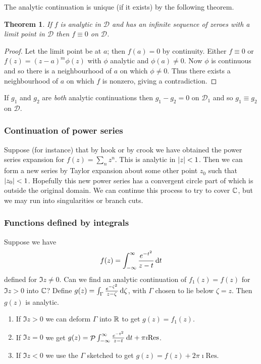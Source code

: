 \documentclass{notes}
\DeclareMathOperator{\Pv}{\mathcal{P}}
\newcommand{\Res}{\mathrm{Res}}
\newcommand{\D}{\mathcal{D}}
\theoremstyle{plain}
\newtheorem*{theorem}{Theorem}
\begin{document}
The analytic continuation is unique (if it exists) by the following theorem.

\begin{theorem}
If $f$ is analytic in $\D$ and has an infinite sequence of zeroes with a
limit point in $\D$ then $f \equiv 0$ on $\D$.
\end{theorem}

\begin{proof}
Let the limit point be at $a$; then $f(a)=0$ by continuity.  Either
$f \equiv 0$ or $f(z) = (z-a)^m \phi(z)$ with $\phi$ analytic and
$\phi(a) \neq 0$.  Now $\phi$ is continuous and so there is a neighbourhood
of $a$ on which $\phi \neq 0$.  Thus there exists a neighbourhood of
$a$ on which $f$ is nonzero, giving a contradiction.
\end{proof}

If $g_1$ and $g_2$ are \emph{both} analytic continuations then
$g_1 - g_2 = 0$ on $\D_1$ and so $g_1 \equiv g_2$ on $\D$.

\subsubsection*{Continuation of power series}

Suppose (for instance) that by hook or by crook we have obtained the
power series expansion for $f(z) = \sum_n z^n$.  This is analytic in
$\left|z\right| < 1$.  Then we can form a new series by Taylor expansion about some
other point $z_0$ such that $\left|z_0\right| < 1$.  Hopefully this new power series
has a convergent circle part of which is outside the original domain.  We
can continue this process to try to cover $\mathbb{C}$, but we may run into
singularities or branch cuts.

\subsubsection*{Functions defined by integrals}

Suppose we have
\[
f(z) = \int_{-\infty}^\infty \frac{e^{-t^2}}{z-t}\, \mathrm{d} t
\]
defined for $\Im z \neq 0$.  Can we find an analytic continuation of
$f_1(z) = f(z)$ for $\Im z > 0$ into $\mathbb{C}$?  Define
$g(z) = \int_\Gamma \frac{e^{-\zeta^2}}{z-\zeta}\, \mathrm{d}\zeta$, with
$\Gamma$ chosen to lie below $\zeta = z$.  Then $g(z)$ is analytic.

\begin{enumerate}
\item If $\Im z > 0$ we can deform $\Gamma$ into $\mathbb{R}$ to get $g(z) = f_1(z)$.
\item If $\Im z = 0$ we get
$g(z) = \Pv \int_{-\infty}^\infty \frac{e^{-t^2}}{z-t}\, \ud t + \pi \imath
\Res$.
\item If $\Im z < 0$ we use the $\Gamma$ sketched to get
$g(z) = f(z) + 2 \pi \imath \Res$.
\end{enumerate}
\end{document}
